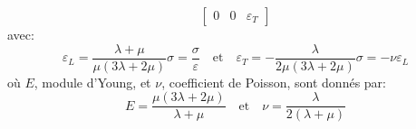 \begin{enumerate}
\begin{equation}
\begin{bmatrix}
                0 & 0 & \varepsilon_T
            \end{bmatrix}
            \label{eq:Ch05-030}
        \end{equation}
        avec:
        \begin{equation}
                \varepsilon_L = \frac{\lambda + \mu}{\mu \left( 3 \lambda + 2 \mu \right)} \sigma = \frac{\sigma}{\varepsilon} \quad\text{et}\quad
                \varepsilon_T = -\frac{\lambda}{2\mu \left( 3 \lambda + 2 \mu \right)} \sigma = -\nu \varepsilon_L
            \label{eq:Ch05-031}
        \end{equation}
        où $E$, module d'Young, et $\nu$, coefficient de Poisson, sont donnés par: 
        \begin{equation}
            E = \frac{\mu \left( 3 \lambda + 2 \mu \right)}{\lambda + \mu}\quad\text{et}\quad \nu = \frac{\lambda}{2 \left( \lambda + \mu \right)}
            \label{eq:Ch05-032}
        \end{equation}
\end{enumerate}

